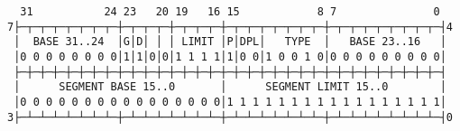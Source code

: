 \documentclass[varwidth=50em]{standalone}
\begin{document}
\begin{verbatim}
  31           24 23   20 19   16 15            8 7               0
7├─┬─┬─┬─┬─┬─┬─┬─┼─┬─┬─┬─┼─┬─┬─┬─┼─┬─┬─┬─┬─┬─┬─┬─┼─┬─┬─┬─┬─┬─┬─┬─┬─┤4
 │  BASE 31..24  │G│D│ │ │ LIMIT │P│DPL│   TYPE  │   BASE 23..16   │
 │0 0 0 0 0 0 0 0│1│1│0│0│1 1 1 1│1│0 0│1 0 0 1 0│0 0 0 0 0 0 0 0 0│
 ├─┼─┼─┼─┼─┼─┼─┼─┼─┼─┼─┼─┼─┼─┼─┼─┼─┼─┼─┼─┼─┼─┼─┼─┼─┼─┼─┼─┼─┼─┼─┼─┼─┤
 │      SEGMENT BASE 15..0       │      SEGMENT LIMIT 15..0        │
 │0 0 0 0 0 0 0 0 0 0 0 0 0 0 0 0│1 1 1 1 1 1 1 1 1 1 1 1 1 1 1 1 1│
3├─┴─┴─┴─┴─┴─┴─┴─┼─┴─┴─┴─┴─┴─┴─┴─┼─┴─┴─┴─┴─┴─┴─┴─┼─┴─┴─┴─┴─┴─┴─┴─┴─┤0
\end{verbatim}
\end{document}
